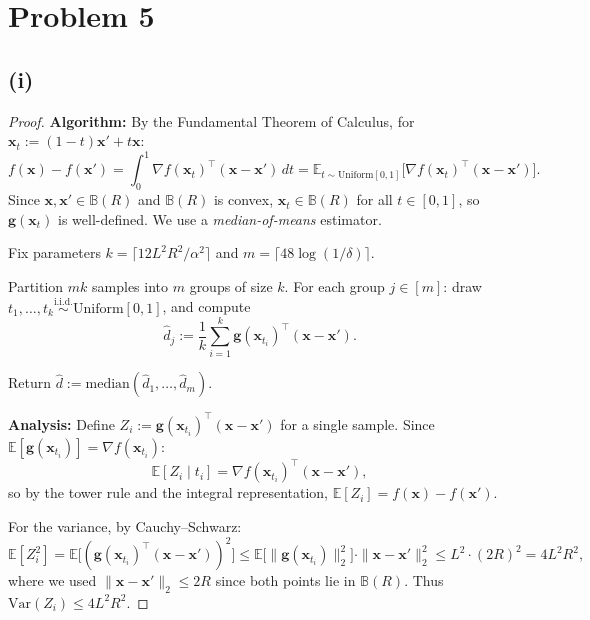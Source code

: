 \documentclass[12pt]{article}
\begin{document}
\section*{Problem 5}
\subsection*{(i)}

\begin{proof}
\textbf{Algorithm:}
By the Fundamental Theorem of Calculus, for $\mathbf{x}_t := (1-t)\mathbf{x}' + t\mathbf{x}$:
\[
f(\mathbf{x}) - f(\mathbf{x}') = \int_0^1 \nabla f(\mathbf{x}_t)^\top (\mathbf{x} - \mathbf{x}')\,dt = \mathbb{E}_{t \sim \mathrm{Uniform}[0,1]}\bigl[\nabla f(\mathbf{x}_t)^\top (\mathbf{x} - \mathbf{x}')\bigr].
\]
Since $\mathbf{x}, \mathbf{x}' \in \mathbb{B}(R)$ and $\mathbb{B}(R)$ is convex, $\mathbf{x}_t \in \mathbb{B}(R)$ for all $t \in [0,1]$, so $\mathbf{g}(\mathbf{x}_t)$ is well-defined. We use a \emph{median-of-means} estimator.

Fix parameters $k = \lceil 12L^2R^2/\alpha^2 \rceil$ and $m = \lceil 48\log(1/\delta) \rceil$.

Partition $mk$ samples into $m$ groups of size $k$. For each group $j \in [m]$: draw $t_1, \ldots, t_k \stackrel{\text{i.i.d.}}{\sim} \mathrm{Uniform}[0,1]$, and compute
\[
\hat{d}_j := \frac{1}{k}\sum_{i=1}^{k} \mathbf{g}(\mathbf{x}_{t_i})^\top (\mathbf{x} - \mathbf{x}').
\]

Return $\hat{d} := \mathrm{median}(\hat{d}_1, \ldots, \hat{d}_m)$.

\medskip
\textbf{Analysis:}
Define $Z_i := \mathbf{g}(\mathbf{x}_{t_i})^\top (\mathbf{x} - \mathbf{x}')$ for a single sample. Since $\mathbb{E}[\mathbf{g}(\mathbf{x}_{t_i})] = \nabla f(\mathbf{x}_{t_i})$:
\[
\mathbb{E}[Z_i \mid t_i] = \nabla f(\mathbf{x}_{t_i})^\top (\mathbf{x} - \mathbf{x}'),
\]
so by the tower rule and the integral representation, $\mathbb{E}[Z_i] = f(\mathbf{x}) - f(\mathbf{x}')$.

For the variance, by Cauchy--Schwarz:
\[
\mathbb{E}[Z_i^2] = \mathbb{E}\bigl[(\mathbf{g}(\mathbf{x}_{t_i})^\top (\mathbf{x} - \mathbf{x}'))^2\bigr] \leq \mathbb{E}\bigl[\|\mathbf{g}(\mathbf{x}_{t_i})\|_2^2\bigr] \cdot \|\mathbf{x} - \mathbf{x}'\|_2^2 \leq L^2 \cdot (2R)^2 = 4L^2R^2,
\]
where we used $\|\mathbf{x} - \mathbf{x}'\|_2 \leq 2R$ since both points lie in $\mathbb{B}(R)$. Thus $\mathrm{Var}(Z_i) \leq 4L^2R^2$.


\end{proof}
\end{document}
